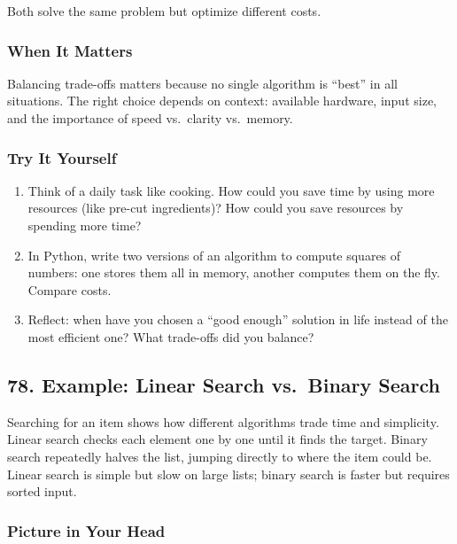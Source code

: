 \documentclass[
  letterpaper,
  DIV=11,
  numbers=noendperiod]{scrreprt}
\providecommand{\tightlist}{%
  \setlength{\itemsep}{0pt}\setlength{\parskip}{0pt}}
\begin{document}
Both solve the same problem but optimize different costs.

\subsubsection{When It Matters}\label{when-it-matters-75}

Balancing trade-offs matters because no single algorithm is ``best'' in
all situations. The right choice depends on context: available hardware,
input size, and the importance of speed vs.~clarity vs.~memory.

\subsubsection{Try It Yourself}\label{try-it-yourself-77}

\begin{enumerate}
\def\labelenumi{\arabic{enumi}.}
\tightlist
\item
  Think of a daily task like cooking. How could you save time by using
  more resources (like pre-cut ingredients)? How could you save
  resources by spending more time?
\item
  In Python, write two versions of an algorithm to compute squares of
  numbers: one stores them all in memory, another computes them on the
  fly. Compare costs.
\item
  Reflect: when have you chosen a ``good enough'' solution in life
  instead of the most efficient one? What trade-offs did you balance?
\end{enumerate}

\subsection{78. Example: Linear Search vs.~Binary
Search}\label{example-linear-search-vs.-binary-search}

Searching for an item shows how different algorithms trade time and
simplicity. Linear search checks each element one by one until it finds
the target. Binary search repeatedly halves the list, jumping directly
to where the item could be. Linear search is simple but slow on large
lists; binary search is faster but requires sorted input.

\subsubsection{Picture in Your Head}\label{picture-in-your-head-78}
\end{document}
